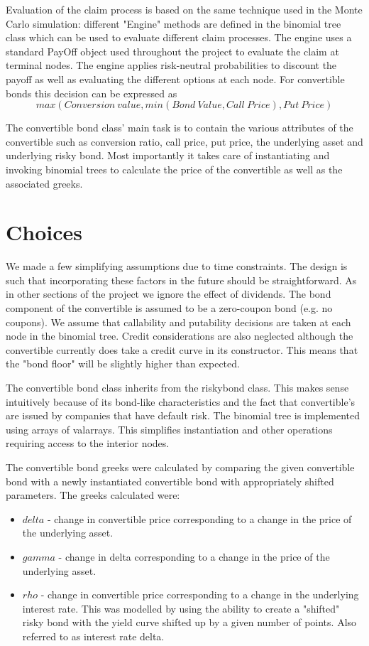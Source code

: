 Evaluation of the claim process is based on the same technique used
in the Monte Carlo simulation: different "Engine" methods are
defined in the binomial tree class which can be used to evaluate
different claim processes. The engine uses a standard PayOff object
used throughout the project to evaluate the claim at terminal nodes.
The engine applies risk-neutral probabilities to discount the payoff
as well as evaluating the different options at each node.  For
convertible bonds this decision can be expressed as 
$$max (Conversion\ value, min (Bond\ Value, Call\ Price), Put\ Price)$$

The convertible bond class' main task is to contain the various
attributes of the convertible such as conversion ratio, call price,
put price, the underlying asset and underlying risky bond.  Most
importantly it takes care of instantiating and invoking binomial
trees to calculate the price of the convertible as well as the
associated greeks.

\section{Choices}

We made a few simplifying assumptions due to time constraints.  The
design is such that incorporating these factors in the future should
be straightforward.  As in other sections of the project we ignore
the effect of dividends.  The bond component of the convertible is
assumed to be a zero-coupon bond (e.g. no coupons). We assume that
callability and putability decisions are taken at each node in the
binomial tree.  Credit considerations are also neglected although
the convertible currently does take a credit curve in its
constructor.  This means that the "bond floor" will be slightly
higher than expected.

The convertible bond class inherits from the riskybond class.  This
makes sense intuitively because of its bond-like characteristics and
the fact that convertible's are issued by companies that have
default risk.  The binomial tree is implemented using arrays of
valarrays.  This simplifies instantiation and other operations
requiring access to the interior nodes.

The convertible bond greeks were calculated by comparing the given
convertible bond with a newly instantiated convertible bond with
appropriately shifted parameters.  The greeks calculated were:
\begin{itemize}
	\item $delta$ - change in convertible price corresponding to a change in
the price of the underlying asset.
	\item $gamma$ - change in delta corresponding to a change in the price of
the underlying asset.
	\item $rho$ - change in convertible price corresponding to a change in the
underlying interest rate. This was modelled by using the ability to
create a "shifted" risky bond with the yield curve shifted up by a
given number of points. Also referred to as interest rate delta.
\end{itemize}


